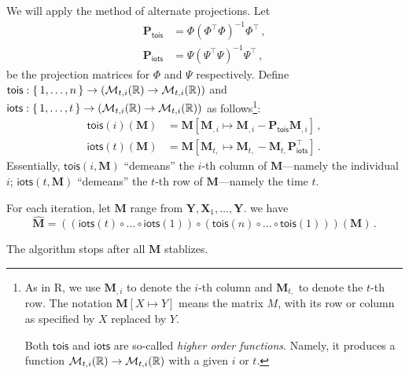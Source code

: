 \documentclass{tufte-handout}
\begin{document}
  \newcommand \Ptois{\mathbf{P}_{\mathsf{tois}}}
  \newcommand \Piots{\mathbf{P}_{\mathsf{iots}}}
  We will apply the method of alternate projections.
  Let
  \begin{align*}
    \Ptois &= \Phi(\Phi^{\top} \Phi)^{-1}\Phi^{\top} \, , \\
    \Piots &= \Psi(\Psi^{\top} \Psi)^{-1}\Psi^{\top} \, ,
  \end{align*}
  be the projection matrices for $\Phi$ and $\Psi$ respectively.
  Define $\mathsf{tois}: \set{ 1, \hdots, n} \to (\mathcal{M}_{t, i}(\mathbb{R}) \to \mathcal{M}_{t, i}(\mathbb{R}))$
     and $\mathsf{iots}: \set{ 1, \hdots, t} \to (\mathcal{M}_{t, i}(\mathbb{R}) \to \mathcal{M}_{t, i}(\mathbb{R}))$
  as follows\footnote{%
    As in R, we use $\mathbf{M}_{,i}$ to denote the $i$-th column and 
    $\mathbf{M}_{t,}$ to denote the $t$-th row.
    The notation $\mathbf{M}[X \mapsto Y]$ means the matrix $M$, with
    its row or column as specified by $X$ replaced by $Y$.

    Both $\mathsf{tois}$ and $\mathsf{iots}$ are so-called \emph{higher order
    functions}. Namely, it produces a function $\mathcal{M}_{t, i}(\mathbb{R}) \to \mathcal{M}_{t, i}(\mathbb{R})$
    with a given $i$ or $t$.
  }:
  \begin{align*}
    \mathsf{tois}(i)(\mathbf{M}) &=
      \mathbf{M}[\mathbf{M}_{,i} \mapsto
        \mathbf{M}_{,i} - \Ptois \mathbf{M}_{,i}] \, , \\
    \mathsf{iots}(t)(\mathbf{M}) &=
      \mathbf{M}[\mathbf{M}_{t,} \mapsto
        \mathbf{M}_{t,} - \mathbf{M}_{t,} \Piots^{\top}] \, .
  \end{align*}
  Essentially,
  $\mathsf{tois}(i, \mathbf{M})$ ``demeans'' the $i$-th column
  of $\mathbf{M}$---namely the individual $i$;
  $\mathsf{iots}(t, \mathbf{M})$ ``demeans'' the $t$-th row
  of $\mathbf{M}$---namely the time $t$.

  For each iteration,
  let $\mathbf{M}$ range from $\mathbf{Y}, \mathbf{X}_1, \hdots, \mathbf{Y}$.
  we have
  \[
    \hat{\mathbf{M}} = (
      (\mathsf{iots}(t) \circ \dots \circ \mathsf{iots}(1)) \circ
      (\mathsf{tois}(n) \circ \dots \circ \mathsf{tois}(1)))(\mathbf{M}) \, .
  \]

  The algorithm stops after all $\mathbf{M}$ stablizes.
\end{document}
